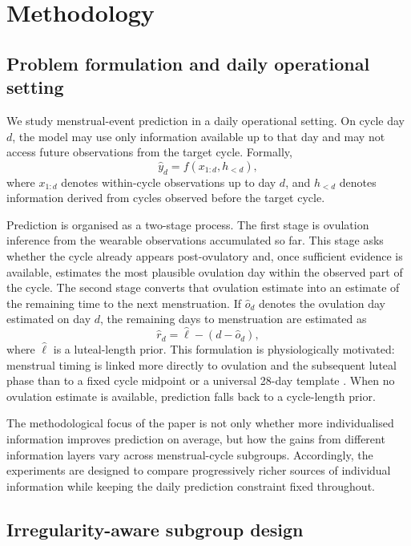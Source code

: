 \documentclass[conference]{IEEEtran}
\begin{document}
\section{Methodology}

\subsection{Problem formulation and daily operational setting}

We study menstrual-event prediction in a daily operational setting. On cycle day $d$, the model may use only information available up to that day and may not access future observations from the target cycle. Formally,
\[
\hat{y}_d = f(x_{1:d}, h_{<d}),
\]
where $x_{1:d}$ denotes within-cycle observations up to day $d$, and $h_{<d}$ denotes information derived from cycles observed before the target cycle.

Prediction is organised as a two-stage process. The first stage is ovulation inference from the wearable observations accumulated so far. This stage asks whether the cycle already appears post-ovulatory and, once sufficient evidence is available, estimates the most plausible ovulation day within the observed part of the cycle. The second stage converts that ovulation estimate into an estimate of the remaining time to the next menstruation. If $\hat{o}_d$ denotes the ovulation day estimated on day $d$, the remaining days to menstruation are estimated as
\[
\hat{r}_d = \hat{\ell} - (d - \hat{o}_d),
\]
where $\hat{\ell}$ is a luteal-length prior. This formulation is physiologically motivated: menstrual timing is linked more directly to ovulation and the subsequent luteal phase than to a fixed cycle midpoint or a universal 28-day template \cite{wilcox2000fertilewindow,bull2019realworld,vollmar2025vitalsign}. When no ovulation estimate is available, prediction falls back to a cycle-length prior.

The methodological focus of the paper is not only whether more individualised information improves prediction on average, but how the gains from different information layers vary across menstrual-cycle subgroups. Accordingly, the experiments are designed to compare progressively richer sources of individual information while keeping the daily prediction constraint fixed throughout.

\subsection{Irregularity-aware subgroup design}
\end{document}
